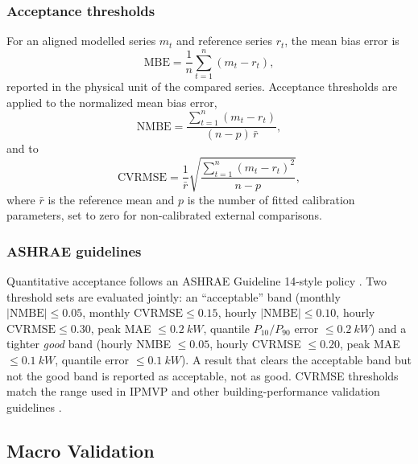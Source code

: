 \subsubsection*{Acceptance thresholds}
For an aligned modelled series $m_t$ and reference series $r_t$, the mean bias error is
\begin{equation}
  \mathrm{MBE} = \frac{1}{n}\sum_{t=1}^{n}(m_t-r_t),
\end{equation}
reported in the physical unit of the compared series. Acceptance thresholds are applied to the normalized mean bias error,
\begin{equation}
  \mathrm{NMBE} =
  \frac{\sum_{t=1}^{n}(m_t-r_t)}
       {(n-p)\,\bar r},
\end{equation}
and to
\begin{equation}
  \mathrm{CVRMSE} =
  \frac{1}{\bar r}
  \sqrt{\frac{\sum_{t=1}^{n}(m_t-r_t)^2}{n-p}},
\end{equation}
where $\bar r$ is the reference mean and $p$ is the number of fitted calibration parameters, set to zero for non-calibrated external comparisons.

\subsubsection*{ASHRAE guidelines}
Quantitative acceptance follows an ASHRAE Guideline 14-style policy \cite{ASHRAE14}. Two threshold sets are evaluated jointly: an ``acceptable'' band (monthly $|\mathrm{NMBE}| \le 0.05$, monthly $\mathrm{CVRMSE} \le 0.15$, hourly $|\mathrm{NMBE}| \le 0.10$, hourly $\mathrm{CVRMSE} \le 0.30$, peak MAE $\le \SI{0.2}{kW}$, quantile $P_{10}/P_{90}$ error $\le \SI{0.2}{kW}$) and a tighter \emph{good} band (hourly NMBE $\le 0.05$, hourly CVRMSE $\le 0.20$, peak MAE $\le \SI{0.1}{kW}$, quantile error $\le \SI{0.1}{kW}$). A result that clears the acceptable band but not the good band is reported as acceptable, not as good. CVRMSE thresholds match the range used in IPMVP and other building-performance validation guidelines \cite{IPMVPCoreConcepts2016}.


\subsection{Macro Validation}
\label{sec:macroValidation}

